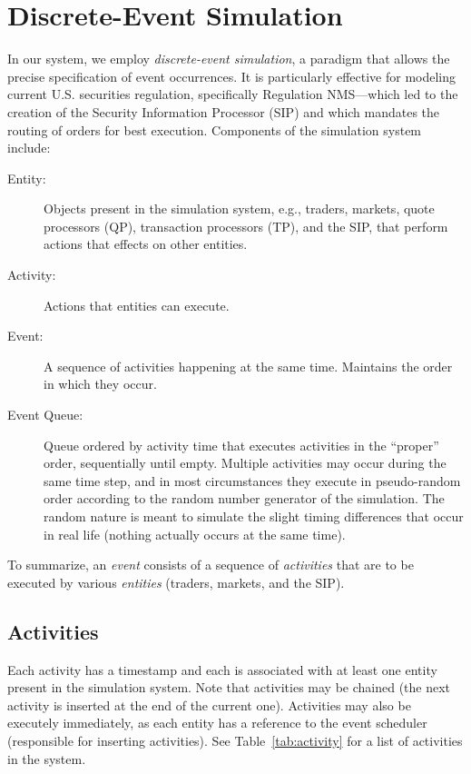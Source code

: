 \documentclass[11pt]{article}
\begin{document}
\section{Discrete-Event Simulation}

In our system, we employ \emph{discrete-event simulation}, a paradigm that
allows the precise specification of event occurrences. It is particularly
effective for modeling current U.S. securities regulation, specifically
Regulation NMS---which led to the creation of the Security Information Processor
(SIP) and which mandates the routing of orders for best execution.  Components
of the simulation system include:

\begin{description}
\item[Entity:] Objects present in the simulation system, e.g., traders, markets, quote processors (QP), transaction processors (TP), and the SIP, that perform actions that effects on other entities.

\item[Activity:] Actions that entities can execute.

\item[Event:] A sequence of activities happening at the same time. Maintains the
  order in which they occur.

\item[Event Queue:] Queue ordered by activity time that executes activities in
  the ``proper'' order, sequentially until empty. Multiple activities may occur
  during the same time step, and in most circumstances they
  execute in pseudo-random order according to the random number generator of the
  simulation. The random nature is meant to simulate the slight timing
  differences that occur in real life (nothing actually occurs at the same
  time).
\end{description}

To summarize, an \emph{event} consists of a sequence of \emph{activities} that
are to be executed by various \emph{entities} (traders, markets, and the SIP).


\subsection{Activities}

Each activity has a timestamp and each is associated with at least one entity
present in the simulation system. Note that activities may be chained (the next activity is inserted at the end of the current one).
Activities may also be executely immediately, as each entity has a reference to the event scheduler (responsible for inserting activities). See
Table~\ref{tab:activity} for a list of activities in the system.
\end{document}
